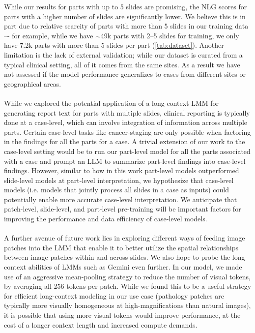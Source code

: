\documentclass[11pt]{article}
\begin{document}
While our results for parts with up to 5 slides are promising, the NLG scores for parts with a higher number of slides are significantly lower. We believe this is in part due to relative scarcity of parts with more than 5 slides in our training data –- for example, while we have $\sim$49k parts with 2--5 slides for training, we only have 7.2k parts with more than 5 slides per part (\autoref{tab:dataset}). Another limitation is the lack of external validation; while our dataset is curated from a typical clinical setting, all of it comes from the same sites. As a result we have not assessed if the model performance generalizes to cases from different sites or geographical areas. \\ \\
While we explored the potential application of a long-context LMM for generating report text for parts with multiple slides, clinical reporting is typically done at a case-level, which can involve integration of information across multiple parts. Certain case-level tasks like cancer-staging are only possible when factoring in the findings for all the parts for a case. A trivial extension of our work to the case-level setting would be to run our part-level model for all the parts associated with a case and prompt an LLM to summarize part-level findings into case-level findings. However, similar to how in this work part-level models outperformed slide-level models at part-level interpretation, we hypothesize that case-level models (i.e. models that jointly process all slides in a case as inputs) could potentially enable more accurate case-level interpretation. We anticipate that patch-level, slide-level, and part-level pre-training will be important factors for improving the performance and data efficiency of case-level models. \\ \\
A further avenue of future work lies in exploring different ways of feeding image patches into the LMM that enable it to better utilize the spatial relationships between image-patches within and across slides. We also hope to probe the long-context abilities of LMMs such as Gemini even further. In our model, we made use of an aggressive mean-pooling strategy to reduce the number of visual tokens, by averaging all 256 tokens per patch. While we found this to be a useful strategy for efficient long-context modeling in our use case (pathology patches are typically more visually homogeneous at high-magnifications than natural images), it is possible that using more visual tokens would improve performance, at the cost of a longer context length and increased compute demands.
\end{document}
